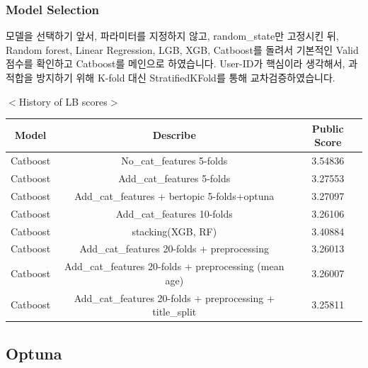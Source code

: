 \documentclass{beamer}
\begin{document}
\begin{frame}[shrink=10]
\frametitle{Model Selection}

{\footnotesize 모델을 선택하기 앞서, 파라미터를 지정하지 않고, random\_state만 고정시킨 뒤, Random forest, Linear Regression, LGB, XGB, Catboost를 돌려서 기본적인 Valid 점수를 확인하고 Catboost를 메인으로 하였습니다. User-ID가 핵심이라 생각해서, 과적합을 방지하기 위해 K-fold 대신 StratifiedKFold를 통해 교차검증하였습니다. }

\begin{center}
$<$History of LB scores$>$
  \begin{tabular}{| c | c | c |}
    \hline
      Model & Describe & Public Score \\ \hline
    Catboost & No\_cat\_features 5-folds & 3.54836                                          \\   \hline
    Catboost & Add\_cat\_features 5-folds& 3.27553                                          \\   \hline
    Catboost & Add\_cat\_features + bertopic 5-folds+optuna& 3.27097                        \\     \hline
    Catboost & Add\_cat\_features 10-folds& 3.26106                                         \\   \hline
    Catboost & stacking(XGB, RF) & 3.40884                                                \\   \hline
    Catboost & Add\_cat\_features 20-folds + preprocessing& 3.26013                         \\   \hline
    Catboost & Add\_cat\_features 20-folds + preprocessing (mean age)& 3.26007                         \\   \hline
    Catboost & Add\_cat\_features 20-folds + preprocessing + title\_split& 3.25811           \\   \hline
  \end{tabular}
\end{center}

\end{frame}
\subsection{Optuna}
\end{document}
